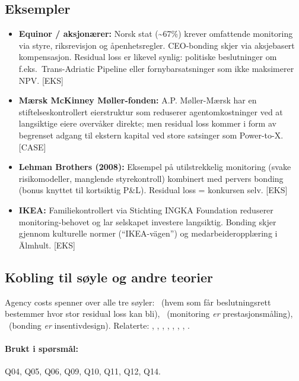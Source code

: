 \subsection*{Eksempler}
\begin{itemize}
\item \textbf{Equinor / aksjonærer:} Norsk stat (\textasciitilde 67\%) krever omfattende monitoring via styre, riksrevisjon og åpenhetsregler. CEO-bonding skjer via aksjebasert kompensasjon. Residual loss er likevel synlig: politiske beslutninger om f.eks.\ Trans-Adriatic Pipeline eller fornybarsatsninger som ikke maksimerer NPV. [EKS]
\item \textbf{Mærsk McKinney Møller-fonden:} A.P. Møller-Mærsk har en stiftelseskontrollert eierstruktur som reduserer agentomkostninger ved at langsiktige eiere overvåker direkte; men residual loss kommer i form av begrenset adgang til ekstern kapital ved store satsinger som Power-to-X. [CASE]
\item \textbf{Lehman Brothers (2008):} Eksempel på utilstrekkelig monitoring (svake risikomodeller, manglende styrekontroll) kombinert med pervers bonding (bonus knyttet til kortsiktig P\&L). Residual loss = konkursen selv. [EKS]
\item \textbf{IKEA:} Familiekontrollert via Stichting INGKA Foundation reduserer monitoring-behovet og lar selskapet investere langsiktig. Bonding skjer gjennom kulturelle normer (``IKEA-vägen'') og medarbeideropplæring i Älmhult. [EKS]
\end{itemize}

\subsection*{Kobling til søyle og andre teorier}
Agency costs spenner over alle tre søyler: \SOne\ (hvem som får beslutningsrett bestemmer hvor stor residual loss kan bli), \STwo\ (monitoring \emph{er} prestasjonsmåling), \SThree\ (bonding \emph{er} insentivdesign). Relaterte: , , , , , , , .

\paragraph{Brukt i spørsmål:} Q04, Q05, Q06, Q09, Q10, Q11, Q12, Q14.
